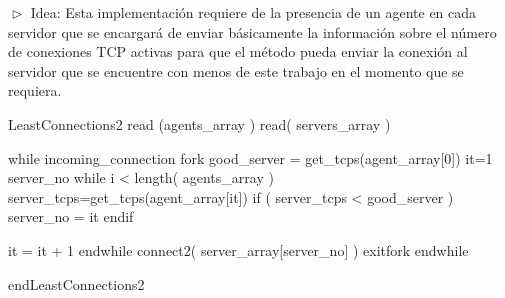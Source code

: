 
$\vartriangleright$ Idea: Esta implementación requiere de la presencia de un agente en cada servidor que se encargará de enviar básicamente
la información sobre el número de conexiones TCP activas para que el método pueda enviar la conexión al servidor que se encuentre con menos de
este trabajo en el momento que se requiera.\\

\begin{verbatimtab}[\myTabs]

LeastConnections2
	read (agents_array )
	read( servers_array )
	
	while incoming_connection
		fork
			good_server = get_tcps(agent_array[0])
			it=1
			server_no
			while i < length( agents_array )
				server_tcps=get_tcps(agent_array[it])
				if ( server_tcps < good_server )
					server_no = it
				endif
			
			it = it + 1
			endwhile
			connect2( server_array[server_no] )
		exitfork
	endwhile
	
endLeastConnections2\\

\end{verbatimtab}\\